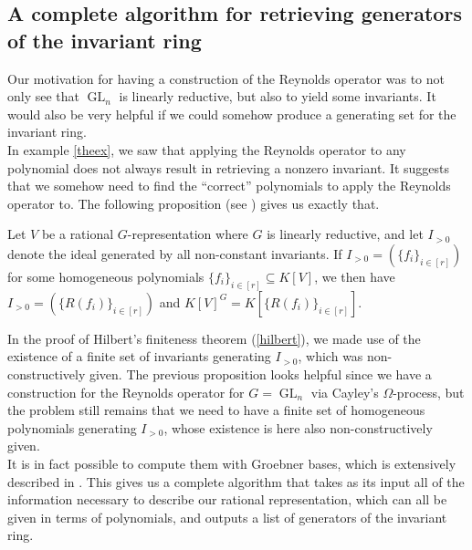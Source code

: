\subsection{A complete algorithm for retrieving generators of the invariant ring}
Our motivation for having a construction of the Reynolds operator was to not only see that $\operatorname{GL}_n$ is linearly reductive, but also to yield some invariants.
It would also be very helpful if we could somehow produce a generating set for the invariant ring.  \\
In example \ref{theex}, we saw that applying the Reynolds operator to any polynomial does not always result in retrieving a nonzero invariant.
It suggests that we somehow need to find the ``correct'' polynomials to apply the Reynolds operator to.
The following proposition (see \cite[prop. 4.1.1]{DK15}) gives us exactly that.
\begin{proposition}
  Let $V$ be a rational $G$-representation where $G$ is linearly reductive, and let $I_{>0}$ denote the ideal generated by all non-constant invariants.
  If $I_{>0} = \left(\{f_i\}_{i \in[r]}\right)$ for some homogeneous polynomials $\{f_i\}_{i\in[r]} \subseteq K[V]$, we then have $I_{>0} = \left(\{R(f_i)\}_{i\in[r]}\right)$ and $K[V]^G = K\left[\{R(f_i)\}_{i\in[r]}\right]$.
\end{proposition}
In the proof of Hilbert's finiteness theorem (\ref{hilbert}), we made use of the existence of a finite set of invariants generating $I_{>0}$, which was non-constructively given.
The previous proposition looks helpful since we have a construction for the Reynolds operator for $G=\operatorname{GL}_n$ via Cayley's $\Omega$-process, but the problem still remains that we need to have a finite set of homogeneous polynomials generating $I_{>0}$, whose existence is here also non-constructively given.  \\
It is in fact possible to compute them with Groebner bases, which is extensively described in \cite[Algorithm 4.1.9]{DK15}.
This gives us a complete algorithm that takes as its input all of the information necessary to describe our rational representation, which can all be given in terms of polynomials, and outputs a list of generators of the invariant ring.

